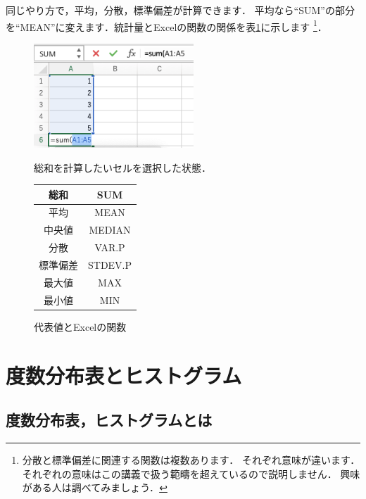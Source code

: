 同じやり方で，平均，分散，標準偏差が計算できます．
平均なら``SUM''の部分を``MEAN''に変えます．統計量とExcelの関数の関係を表\ref{tab:funcs}に示します
\footnote{分散と標準偏差に関連する関数は複数あります．
  それぞれ意味が違います．
  それぞれの意味はこの講義で扱う範疇を超えているので説明しません．
  興味がある人は調べてみましょう．}．

\begin{figure}[htbp]
    \begin{minipage}{0.5\hsize}
        \centering
        \includegraphics[width=6cm]{chap1/sum.png}
        \caption{総和を計算したいセルを選択した状態．}
        \label{fig:sum}
    \end{minipage}
    \begin{minipage}{0.5\hsize}
        \centering
        \makeatletter
        \def\@captype{table}
        \makeatother
        \caption{代表値とExcelの関数}
        \begin{tabular}{|c|c|}
          \hline
          総和     & SUM\\ \hline
          平均     & MEAN\\ \hline
          中央値   & MEDIAN \\ \hline
          分散     & VAR.P\\ \hline
          標準偏差 & STDEV.P \\ \hline
          最大値   & MAX \\ \hline
          最小値   & MIN \\ \hline
        \end{tabular}
        \label{tab:funcs}
    \end{minipage}
\end{figure}

\section{度数分布表とヒストグラム}

\subsection{度数分布表，ヒストグラムとは}

